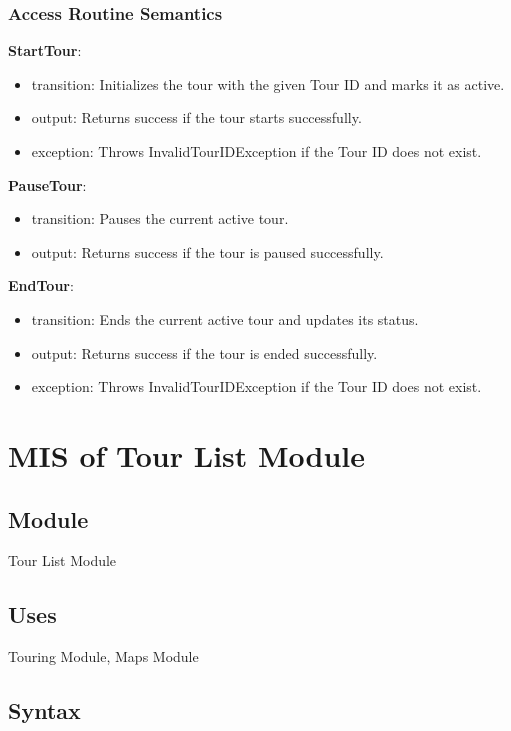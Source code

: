 \documentclass[12pt, titlepage]{article}
\begin{document}
\subsubsection{Access Routine Semantics}

\noindent \textbf{StartTour}:
\begin{itemize}
  \item transition: Initializes the tour with the given Tour ID and marks it as active.
  \item output: Returns success if the tour starts successfully.
  \item exception: Throws InvalidTourIDException if the Tour ID does not exist.
\end{itemize}

\noindent \textbf{PauseTour}:
\begin{itemize}
  \item transition: Pauses the current active tour.
  \item output: Returns success if the tour is paused successfully.
\end{itemize}

\noindent \textbf{EndTour}:
\begin{itemize}
  \item transition: Ends the current active tour and updates its status.
  \item output: Returns success if the tour is ended successfully.
  \item exception: Throws InvalidTourIDException if the Tour ID does not exist.
\end{itemize}

\newpage

\section{MIS of Tour List Module} \label{TourListModule}

\subsection{Module}

Tour List Module

\subsection{Uses}

Touring Module, Maps Module

\subsection{Syntax}
\end{document}
